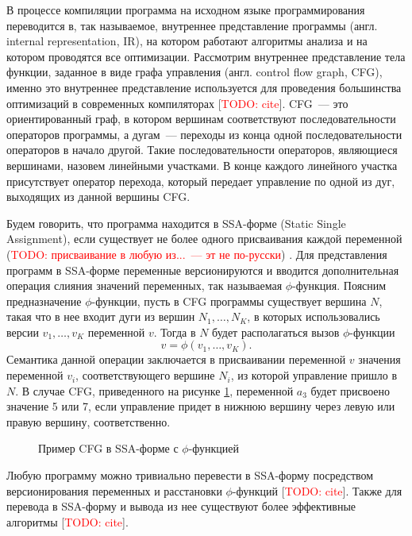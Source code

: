 \documentclass[14pt,titlepage]{extarticle}
\newcommand{\todo}[1]{\textcolor{red}{\eng{TODO}: #1}}
\newcommand{\todocite}{[\todo{cite}]}
\newcommand{\eng}[1]{{\English#1}}
\begin{document}
      В процессе компиляции программа на исходном языке программирования
      переводится в, так называемое, внутреннее представление программы
      (англ. \eng{internal representation, IR}), на котором работают
      алгоритмы анализа и на котором проводятся все оптимизации.
      Рассмотрим внутреннее представление тела функции, заданное в виде
      графа управления (англ. \eng{control flow graph, CFG}), именно это
      внутреннее представление используется для проведения большинства
      оптимизаций в современных компиляторах \todocite.
      CFG~--- это ориентированный граф, в котором вершинам соответствуют
      последовательности операторов программы, а дугам~--- переходы из конца
      одной последовательности операторов в начало другой. Такие
      последовательности операторов, являющиеся вершинами, назовем линейными
      участками. В конце каждого линейного участка присутствует оператор
      перехода, который передает управление по одной из дуг, выходящих из
      данной вершины CFG.

      Будем говорить, что программа находится в SSA-форме (\eng{Static Single
      Assignment}), если существует не более одного присваивания каждой
      переменной (\todo{присваивание в любую из...~--- эт не по-русски})
      \cite{ssa}.
      Для представления программ в SSA-форме переменные версионируются и
      вводится дополнительная операция слияния значений переменных, так
      называемая $\phi$-функция.
      Поясним предназначение $\phi$-функции, пусть в CFG программы существует
      вершина $N$, такая что в нее входит дуги из вершин $N_1, \ldots, N_K$, в
      которых использовались версии $v_1, \ldots, v_K$ переменной $v$. Тогда в
      $N$ будет располагаться вызов $\phi$-функции
      \[ v = \phi(v_1, \ldots, v_K). \]
      Семантика данной операции заключается в присваивании переменной $v$
      значения переменной $v_i$, соответствующего вершине $N_i$, из которой
      управление пришло в $N$. В случае CFG, приведенного на рисунке
      \ref{fig:cfg_with_phi}, переменной $a_3$ будет присвоено значение 5 или
      7, если управление придет в нижнюю вершину через левую или правую
      вершину, соответственно.

      \begin{figure}[!htb]
        \caption{Пример CFG в SSA-форме с $\phi$-функцией}
        \label{fig:cfg_with_phi}
      \end{figure}

      Любую программу можно тривиально перевести в SSA-форму посредством
      версионирования переменных и расстановки $\phi$-функций \todocite.
      Также для перевода в SSA-форму и вывода из нее существуют более
      эффективные алгоритмы \cite{ssa} \todocite.
\end{document}
